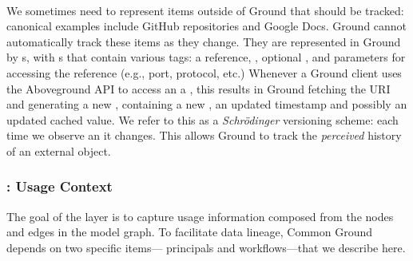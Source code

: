 \documentclass{sig-alternate}
\begin{document}
\\
We sometimes need to represent items outside of Ground that should be tracked: canonical examples
include GitHub repositories and Google Docs. Ground cannot automatically track these items as they change.
They are represented in Ground by s, with s that contain various tags: a \uri reference,  , optional , and parameters for accessing the
reference (e.g., port, protocol, etc.) 
Whenever a Ground client uses the Aboveground API to access an a , this results in Ground fetching the URI and generating a new , containing a new
, an updated timestamp and possibly an updated cached value. We refer to this as a \emph{Schr\"{o}dinger} versioning scheme: each time we observe an  it changes. This allows Ground to track the \emph{perceived} history of an external object.


\subsubsection{\Crust: Usage Context}
The goal of the \crust layer is to capture usage information composed from the nodes and edges in the model graph.  
To facilitate data lineage, Common Ground depends on two specific items---
principals and workflows---that we describe here.
\end{document}
